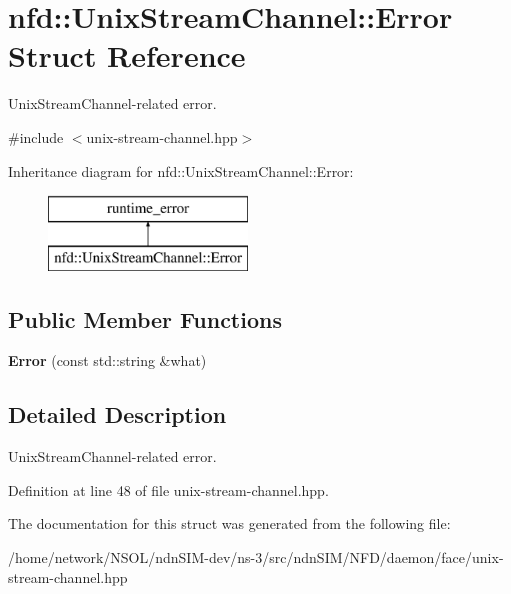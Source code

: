 \hypertarget{structnfd_1_1UnixStreamChannel_1_1Error}{}\section{nfd\+:\+:Unix\+Stream\+Channel\+:\+:Error Struct Reference}
\label{structnfd_1_1UnixStreamChannel_1_1Error}


Unix\+Stream\+Channel-\/related error.  




{\ttfamily \#include $<$unix-\/stream-\/channel.\+hpp$>$}

Inheritance diagram for nfd\+:\+:Unix\+Stream\+Channel\+:\+:Error\+:\begin{figure}[H]
\begin{center}
\leavevmode
\includegraphics[height=2.000000cm]{structnfd_1_1UnixStreamChannel_1_1Error}
\end{center}
\end{figure}
\subsection*{Public Member Functions}
\begin{DoxyCompactItemize}
\item 
{\bfseries Error} (const std\+::string \&what)\hypertarget{structnfd_1_1UnixStreamChannel_1_1Error_ad4f1475dd74fb8eaf360ac302c7de6fa}{}\label{structnfd_1_1UnixStreamChannel_1_1Error_ad4f1475dd74fb8eaf360ac302c7de6fa}

\end{DoxyCompactItemize}


\subsection{Detailed Description}
Unix\+Stream\+Channel-\/related error. 

Definition at line 48 of file unix-\/stream-\/channel.\+hpp.



The documentation for this struct was generated from the following file\+:\begin{DoxyCompactItemize}
\item 
/home/network/\+N\+S\+O\+L/ndn\+S\+I\+M-\/dev/ns-\/3/src/ndn\+S\+I\+M/\+N\+F\+D/daemon/face/unix-\/stream-\/channel.\+hpp\end{DoxyCompactItemize}
